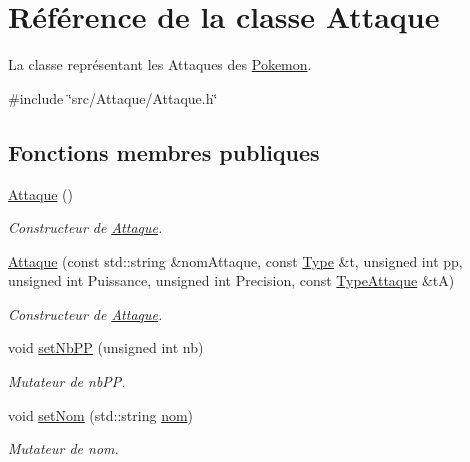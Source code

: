 \hypertarget{class_attaque}{}\section{Référence de la classe Attaque}
\label{class_attaque}


La classe représentant les Attaques des \hyperlink{class_pokemon}{Pokemon}.  




{\ttfamily \#include \char`\"{}src/\+Attaque/\+Attaque.\+h\char`\"{}}

\subsection*{Fonctions membres publiques}
\begin{DoxyCompactItemize}
\item 
\hyperlink{class_attaque_a1683db1342d1d26f9fc2162ef1975b23}{Attaque} ()
\begin{DoxyCompactList}\small\item\em Constructeur de \hyperlink{class_attaque}{Attaque}. \end{DoxyCompactList}\item 
\hyperlink{class_attaque_a1f2944283be354dcc2a19f84a537281c}{Attaque} (const std\+::string \&nom\+Attaque, const \hyperlink{_attaque_8h_a1d1cfd8ffb84e947f82999c682b666a7}{Type} \&t, unsigned int pp, unsigned int Puissance, unsigned int Precision, const \hyperlink{_attaque_8h_acefba67470a7a2e69ed731d28d318e64}{Type\+Attaque} \&tA)
\begin{DoxyCompactList}\small\item\em Constructeur de \hyperlink{class_attaque}{Attaque}. \end{DoxyCompactList}\item 
void \hyperlink{class_attaque_a6e0b308dd1d9ddab688378e2630cb597}{set\+Nb\+PP} (unsigned int nb)
\begin{DoxyCompactList}\small\item\em Mutateur de nb\+PP. \end{DoxyCompactList}\item 
void \hyperlink{class_attaque_a15bcb3d5d9add6357427cfb399e5584a}{set\+Nom} (std\+::string \hyperlink{class_attaque_a4adbe83e5fca0bd7533b32ff382dc682}{nom})
\begin{DoxyCompactList}\small\item\em Mutateur de nom. \end{DoxyCompactList}\item 

\end{DoxyCompactItemize}
